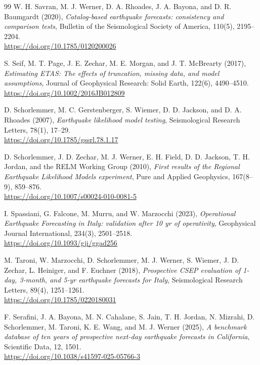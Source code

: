 \documentclass[12pt,letterpaper]{article}
\begin{document}
\begin{thebibliography}{99}
W. H. Savran, M. J. Werner, D. A. Rhoades, J. A. Bayona, and D. R. Baumgardt
(2020),
\emph{Catalog-based earthquake forecasts: consistency and comparison tests},
Bulletin of the Seismological Society of America, 110(5), 2195--2204.\\
\url{https://doi.org/10.1785/0120200026}

S. Seif, M. T. Page, J. E. Zechar, M. E. Morgan, and J. T. McBrearty (2017),
\emph{Estimating ETAS: The effects of truncation, missing data, and model
assumptions},
Journal of Geophysical Research: Solid Earth, 122(6), 4490--4510.\\
\url{https://doi.org/10.1002/2016JB012809}

D. Schorlemmer, M. C. Gerstenberger, S. Wiemer, D. D. Jackson, and
D. A. Rhoades (2007),
\emph{Earthquake likelihood model testing},
Seismological Research Letters, 78(1), 17--29.\\
\url{https://doi.org/10.1785/gssrl.78.1.17}

D. Schorlemmer, J. D. Zechar, M. J. Werner, E. H. Field, D. D. Jackson,
T. H. Jordan, and the RELM Working Group (2010),
\emph{First results of the Regional Earthquake Likelihood Models experiment},
Pure and Applied Geophysics, 167(8--9), 859--876.\\
\url{https://doi.org/10.1007/s00024-010-0081-5}

I. Spassiani, G. Falcone, M. Murru, and W. Marzocchi (2023),
\emph{Operational Earthquake Forecasting in Italy: validation after 10 yr of
operativity},
Geophysical Journal International, 234(3), 2501--2518.\\
\url{https://doi.org/10.1093/gji/ggad256}

M. Taroni, W. Marzocchi, D. Schorlemmer, M. J. Werner, S. Wiemer,
J. D. Zechar, L. Heiniger, and F. Euchner (2018),
\emph{Prospective CSEP evaluation of 1-day, 3-month, and 5-yr earthquake
forecasts for Italy},
Seismological Research Letters, 89(4), 1251--1261.\\
\url{https://doi.org/10.1785/0220180031}

F. Serafini, J. A. Bayona, M. N. Cahalane, S. Jain, T. H. Jordan,
N. Mizrahi, D. Schorlemmer, M. Taroni, K. E. Wang, and M. J. Werner (2025),
\emph{A benchmark database of ten years of prospective next-day earthquake
forecasts in California},
Scientific Data, 12, 1501.\\
\url{https://doi.org/10.1038/s41597-025-05766-3}


\end{thebibliography}
\end{document}
